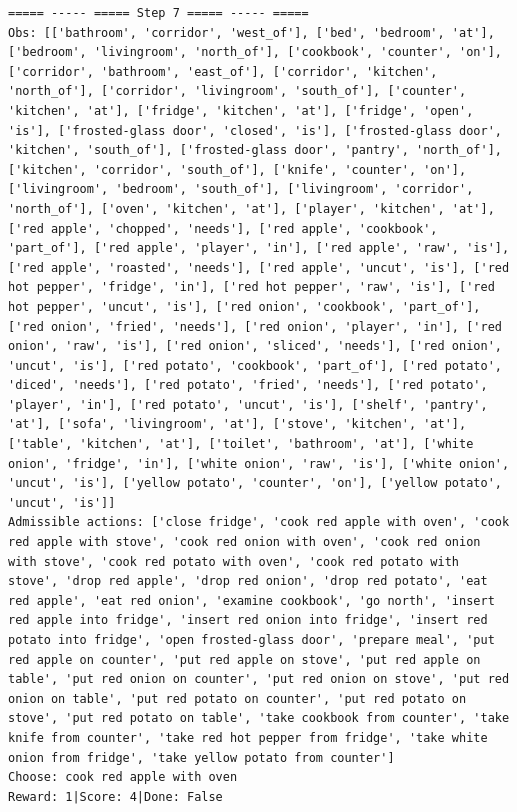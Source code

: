 \documentclass[11pt]{article}
\begin{document}
\begin{lstlisting}
===== ----- ===== Step 7 ===== ----- =====
Obs: [['bathroom', 'corridor', 'west_of'], ['bed', 'bedroom', 'at'], ['bedroom', 'livingroom', 'north_of'], ['cookbook', 'counter', 'on'], ['corridor', 'bathroom', 'east_of'], ['corridor', 'kitchen', 'north_of'], ['corridor', 'livingroom', 'south_of'], ['counter', 'kitchen', 'at'], ['fridge', 'kitchen', 'at'], ['fridge', 'open', 'is'], ['frosted-glass door', 'closed', 'is'], ['frosted-glass door', 'kitchen', 'south_of'], ['frosted-glass door', 'pantry', 'north_of'], ['kitchen', 'corridor', 'south_of'], ['knife', 'counter', 'on'], ['livingroom', 'bedroom', 'south_of'], ['livingroom', 'corridor', 'north_of'], ['oven', 'kitchen', 'at'], ['player', 'kitchen', 'at'], ['red apple', 'chopped', 'needs'], ['red apple', 'cookbook', 'part_of'], ['red apple', 'player', 'in'], ['red apple', 'raw', 'is'], ['red apple', 'roasted', 'needs'], ['red apple', 'uncut', 'is'], ['red hot pepper', 'fridge', 'in'], ['red hot pepper', 'raw', 'is'], ['red hot pepper', 'uncut', 'is'], ['red onion', 'cookbook', 'part_of'], ['red onion', 'fried', 'needs'], ['red onion', 'player', 'in'], ['red onion', 'raw', 'is'], ['red onion', 'sliced', 'needs'], ['red onion', 'uncut', 'is'], ['red potato', 'cookbook', 'part_of'], ['red potato', 'diced', 'needs'], ['red potato', 'fried', 'needs'], ['red potato', 'player', 'in'], ['red potato', 'uncut', 'is'], ['shelf', 'pantry', 'at'], ['sofa', 'livingroom', 'at'], ['stove', 'kitchen', 'at'], ['table', 'kitchen', 'at'], ['toilet', 'bathroom', 'at'], ['white onion', 'fridge', 'in'], ['white onion', 'raw', 'is'], ['white onion', 'uncut', 'is'], ['yellow potato', 'counter', 'on'], ['yellow potato', 'uncut', 'is']]
Admissible actions: ['close fridge', 'cook red apple with oven', 'cook red apple with stove', 'cook red onion with oven', 'cook red onion with stove', 'cook red potato with oven', 'cook red potato with stove', 'drop red apple', 'drop red onion', 'drop red potato', 'eat red apple', 'eat red onion', 'examine cookbook', 'go north', 'insert red apple into fridge', 'insert red onion into fridge', 'insert red potato into fridge', 'open frosted-glass door', 'prepare meal', 'put red apple on counter', 'put red apple on stove', 'put red apple on table', 'put red onion on counter', 'put red onion on stove', 'put red onion on table', 'put red potato on counter', 'put red potato on stove', 'put red potato on table', 'take cookbook from counter', 'take knife from counter', 'take red hot pepper from fridge', 'take white onion from fridge', 'take yellow potato from counter']
Choose: cook red apple with oven
Reward: 1|Score: 4|Done: False


\end{lstlisting}
\end{document}
